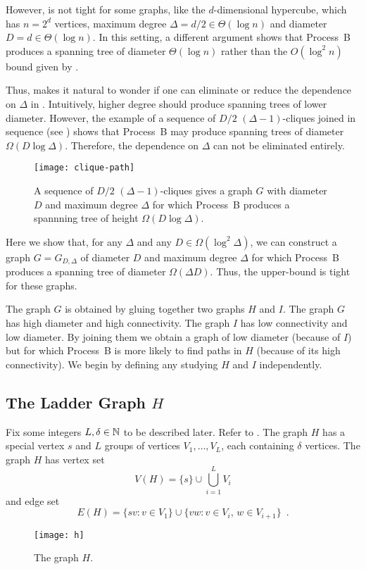 \documentclass{patmorin}
\begin{document}
However,  is not tight for some graphs, like
the $d$-dimensional hypercube, which has $n=2^d$ vertices, maximum degree
$\Delta = d/2 \in \Theta(\log n)$ and diameter $D=d\in\Theta(\log n)$.
In this setting, a different argument shows that Process~B produces a
spanning tree of diameter $\Theta(\log n)$ rather than the $O(\log^2 n)$
bound given by .

Thus, makes it natural to wonder if one can eliminate or reduce the
dependence on $\Delta$ in .  Intuitively,
higher degree should produce spanning trees of lower diameter.  However,
the example of a sequence of $D/2$ $(\Delta-1)$-cliques joined in sequence
(see ) shows that Process~B may produce spanning
trees of diameter $\Omega(D\log\Delta)$.  Therefore, the dependence on
$\Delta$ can not be eliminated entirely.

\begin{figure}
  \begin{center}
    \texttt{[image: clique-path]}
  \end{center}
  \caption{A sequence of $D/2$ $(\Delta-1)$-cliques gives a graph $G$
   with diameter $D$ and maximum degree $\Delta$ for which Process~B
   produces a spannning tree of height $\Omega(D\log\Delta)$.}
\end{figure}

Here we show that, for any $\Delta$ and any $D\in\Omega(\log^2\Delta)$,
we can construct a graph $G=G_{D,\Delta}$ of diameter $D$ and maximum
degree $\Delta$ for which Process~B produces a spanning tree of diameter
$\Omega(\Delta D)$.  Thus, the upper-bound 
is tight for these graphs.  

The graph $G$ is obtained by gluing together two graphs $H$ and $I$.
The graph $G$ has high diameter and high connectivity.  The graph $I$
has low connectivity and low diameter.  By joining them we obtain a graph
of low diameter (because of $I$) but for which Process~B is more likely
to find paths in $H$ (because of its high connectivity).  We begin by
defining any studying $H$ and $I$ independently.


\subsection{The Ladder Graph $H$}

Fix some integers $L,\delta\in\mathbb{N}$ to be described later.  Refer to
.  The graph $H$ has a special vertex $s$ and $L$ groups of
vertices $V_1,\ldots,V_L$, each containing $\delta$ vertices.  The graph 
$H$ has vertex set
\[
   V(H) = \{s\}\cup\bigcup_{i=1}^L V_i
\]
and edge set
\[
   E(H) = \{sv : v\in V_1\}
       \cup \{vw : v\in V_{i},\, w\in V_{i+1}\} \enspace .
\]
\begin{figure}
  \begin{center}
    \texttt{[image: h]} 
  \end{center}
  \caption{The graph $H$.}
\end{figure}
\end{document}
